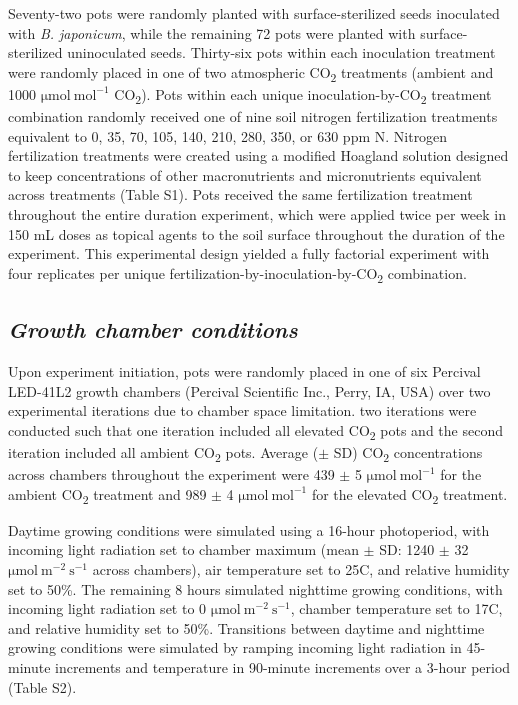 Seventy-two pots were randomly planted with surface-sterilized seeds inoculated with \textit{B. japonicum}, while the remaining 72 pots were planted with surface-sterilized uninoculated seeds. Thirty-six pots within each inoculation treatment were randomly placed in one of two atmospheric CO\textsubscript{2} treatments (ambient and 1000 $\mathrm{\mu mol\ mol^{-1}}$ CO\textsubscript{2}). Pots within each unique inoculation-by-CO\textsubscript{2} treatment combination randomly received one of nine soil nitrogen fertilization treatments equivalent to 0, 35, 70, 105, 140, 210, 280, 350, or 630 ppm N. Nitrogen fertilization treatments were created using a modified Hoagland solution  designed to keep concentrations of other macronutrients and micronutrients equivalent across treatments (Table S1). Pots received the same fertilization treatment throughout the entire duration experiment, which were applied twice per week in 150 mL doses as topical agents to the soil surface throughout the duration of the experiment. This experimental design yielded a fully factorial experiment with four replicates per unique fertilization-by-inoculation-by-CO\textsubscript{2} combination.

\subsection{\textit{Growth chamber conditions}}
Upon experiment initiation, pots were randomly placed in one of six Percival LED-41L2 growth chambers (Percival Scientific Inc., Perry, IA, USA) over two experimental iterations due to chamber space limitation. two iterations were conducted such that one iteration included all elevated CO\textsubscript{2} pots and the second iteration included all ambient CO\textsubscript{2} pots. Average ($\pm$ SD) CO\textsubscript{2} concentrations across chambers throughout the experiment were 439 $\pm$ 5 $\mathrm{\mu mol\ mol^{-1}}$ for the ambient CO\textsubscript{2} treatment and 989 $\pm$ 4 $\mathrm{\mu mol\ mol^{-1}}$ for the elevated CO\textsubscript{2} treatment.
    
Daytime growing conditions were simulated using a 16-hour photoperiod, with incoming light radiation set to chamber maximum (mean $\pm$ SD: 1240 $\pm$ 32 $\mathrm{\mu mol\ m^{-2}\ s^{-1}}$ across chambers), air temperature set to 25\textdegree{}C, and relative humidity set to 50\%. The remaining 8 hours simulated nighttime growing conditions, with incoming light radiation set to 0 $\mathrm{\mu mol\ m^{-2}\ s^{-1}}$, chamber temperature set to 17\textdegree{}C, and relative humidity set to 50\%. Transitions between daytime and nighttime growing conditions were simulated by ramping incoming light radiation in 45-minute increments and temperature in 90-minute increments over a 3-hour period (Table S2).
    
